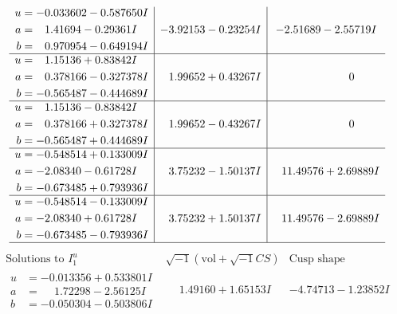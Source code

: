 \documentclass[1p]{elsarticle_modified}
\theoremstyle{definition}
\newcommand{\I}{\sqrt{-1}}
\begin{document}
$$\begin{array}{c|c|c}
\begin{aligned}
u &= -0.033602 - 0.587650 I \\
a &= \phantom{-}1.41694 - 0.29361 I \\
b &= \phantom{-}0.970954 - 0.649194 I\end{aligned}
 & -3.92153 - 0.23254 I & -2.51689 - 2.55719 I \\ \hline\begin{aligned}
u &= \phantom{-}1.15136 + 0.83842 I \\
a &= \phantom{-}0.378166 - 0.327378 I \\
b &= -0.565487 - 0.444689 I\end{aligned}
 & \phantom{-}1.99652 + 0.43267 I & \phantom{-0.000000 } 0 \\ \hline\begin{aligned}
u &= \phantom{-}1.15136 - 0.83842 I \\
a &= \phantom{-}0.378166 + 0.327378 I \\
b &= -0.565487 + 0.444689 I\end{aligned}
 & \phantom{-}1.99652 - 0.43267 I & \phantom{-0.000000 } 0 \\ \hline\begin{aligned}
u &= -0.548514 + 0.133009 I \\
a &= -2.08340 - 0.61728 I \\
b &= -0.673485 + 0.793936 I\end{aligned}
 & \phantom{-}3.75232 - 1.50137 I & \phantom{-}11.49576 + 2.69889 I \\ \hline\begin{aligned}
u &= -0.548514 - 0.133009 I \\
a &= -2.08340 + 0.61728 I \\
b &= -0.673485 - 0.793936 I\end{aligned}
 & \phantom{-}3.75232 + 1.50137 I & \phantom{-}11.49576 - 2.69889 I\\
 \hline 
 \end{array}$$\newpage$$\begin{array}{c|c|c}  
\text{Solutions to }I^u_{1}& \I (\text{vol} + \sqrt{-1}CS) & \text{Cusp shape}\\
 \hline 
\begin{aligned}
u &= -0.013356 + 0.533801 I \\
a &= \phantom{-}1.72298 - 2.56125 I \\
b &= -0.050304 - 0.503806 I\end{aligned}
 & \phantom{-}1.49160 + 1.65153 I & -4.74713 - 1.23852 I \\ \hline\begin{aligned}

\end{aligned}
\end{array}$$
\end{document}
